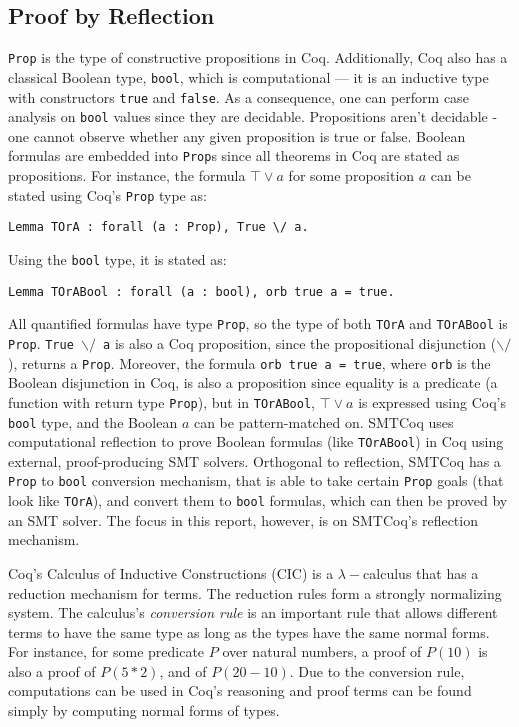 \documentclass{article}
\begin{document}
	\subsection{Proof by Reflection}
	\label{reflect}
	\texttt{Prop} is the type of 
	constructive propositions in Coq. 
	Additionally, Coq also has a 
	classical Boolean type, 
	\texttt{bool}, which is 
	computational --- it is an 
	inductive type with constructors 
	\texttt{true} and \texttt{false}. 
	As a consequence, one can 
	perform case analysis on 
	\texttt{bool} values since they 
	are decidable. Propositions 
	aren't decidable - one cannot 
	observe whether any given 
	proposition is true or false. 
	Boolean formulas are embedded 
	into \texttt{Prop}s since all 
	theorems in Coq are stated as 
	propositions. For instance, the 
	formula 
	$\top \lor a$ for some 
	proposition $a$ can be stated 
	using Coq's \texttt{Prop} type as:
\begin{verbatim}
Lemma TOrA : forall (a : Prop), True \/ a.
\end{verbatim}
	Using the \texttt{bool} type, it 
	is stated as:
\begin{verbatim}
Lemma TOrABool : forall (a : bool), orb true a = true.
\end{verbatim}
 	All quantified formulas have type
 	\texttt{Prop}, so the type of both
 	\texttt{TOrA} and \texttt{TOrABool}
 	is \texttt{Prop}. 
 	\texttt{True $\backslash/$ a}
 	is also a Coq proposition, since 
 	the propositional disjunction
 	(\texttt{$\backslash/$}), returns a 
 	\texttt{Prop}. Moreover, the 
 	formula \texttt{orb true a = true}, 
 	where \texttt{orb} is the 
 	Boolean disjunction in Coq, 
 	is also a proposition since 
 	equality is a predicate 
 	(a function with return 
 	type \texttt{Prop}), but in 
 	\texttt{TOrABool}, $\top \lor a$ 
 	is expressed using Coq's 
 	\texttt{bool} type, and the 
 	Boolean $a$ can be pattern-matched 
 	on. SMTCoq uses computational 
 	reflection to prove Boolean 
 	formulas (like \texttt{TOrABool})
 	in Coq using external, 
	proof-producing SMT solvers. 
	Orthogonal to reflection, 
	SMTCoq has a \texttt{Prop} to 
	\texttt{bool} conversion 
	mechanism, that is able to take 
	certain \texttt{Prop}
	goals (that look like 
	\texttt{TOrA}), and convert 
	them to \texttt{bool} formulas, 
	which can then be proved by 
	an SMT solver. The focus in 
	this report, however,  
	is on SMTCoq's reflection 
	mechanism.
	 
	Coq's Calculus of Inductive 
	Constructions (CIC) is a 
	$\lambda-$calculus that has a 
	reduction mechanism for terms. The
	reduction rules form a strongly 
	normalizing system. The calculus's
	\textit{conversion rule} is an 
	important rule that allows different 
	terms to have the same type as 
	long as the types have the same 
	normal forms. For instance, for some 
	predicate $P$ over natural numbers, 
	a proof of $P(10)$ is also a proof 
	of $P(5*2)$, and of $P(20-10)$. Due 
	to the conversion rule, computations 
	can be used in Coq's reasoning and 
	proof terms can be found simply by 
	computing normal forms of types.
	
\end{document}
